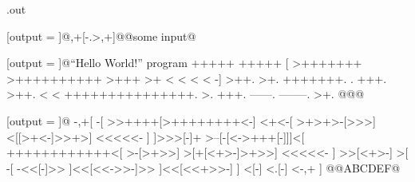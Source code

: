 \RequirePackage{runner}
\newcommand{\result}{}
\makeatletter
\newwrite \outfile
\immediate\openout\outfile \jobname.out

[output = \result]@,+[-.>,+]@@some input@
\typeout{\result}

[output = \result]@``Hello World!'' program
  +++++ +++++
    [ >+++++++ >++++++++++ >+++ >+ < < < < -]
  >++.
  >+.
  +++++++.
  .
  +++.
  >++.
  < < +++++++++++++++.
  >.
  +++.
  ------.
  --------.
  >+.
@@@
\typeout{\result}

[output = \result]@
  -,+[
    -[
      >>++++[>++++++++<-]
      <+<-[
        >+>+>-[>>>]
        <[[>+<-]>>+>]
        <<<<<-
      ]
    ]>>>[-]+
    >--[-[<->+++[-]]]<[
      ++++++++++++<[
        >-[>+>>]
        >[+[<+>-]>+>>]
        <<<<<-
      ]
      >>[<+>-]
      >[
        -[
          -<<[-]>>
        ]<<[<<->>-]>>
      ]<<[<<+>>-]
    ]
    <[-]
    <.[-]
    <-,+
  ]
@@ABCDEF@
\typeout{\result}

\stop